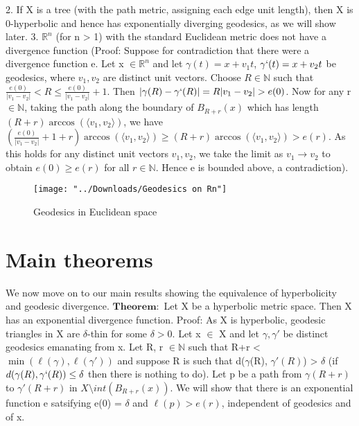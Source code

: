 \documentclass[11pt]{article}
\newcommand{\vs}{\vskip10pt}
\begin{document}
	
	\vs
	2. If X is a tree (with the path metric, assigning each edge unit length), then X is 0-hyperbolic and hence has exponentially diverging geodesics, as we will show later.
	\vs
	3. $\mathbb{R}^n$ (for n > 1) with the standard Euclidean metric does not have a divergence function (Proof: Suppose for contradiction that there were a divergence function e. Let x $\in \mathbb{R}^n$ and let $\gamma(t) = x + v_1t$, $\gamma`(t) = x + v_2t$ be geodesics, where $v_1, v_2 $ are distinct unit vectors. Choose $R \in \mathbb{N}$ such that $\frac{e(0)}{\vert v_1 - v_2 \vert } < R \leq \frac{e(0)}{\vert v_1 - v_2 \vert } + 1$. Then $\vert \gamma(R) - \gamma`(R) \vert = R \vert v_1 - v_2 \vert > e(0)$. Now for any r $\in \mathbb{N}$, taking the path along the boundary of $B_{R+r}(x)$ which has length $(R+r) \arccos(\langle v_1, v_2 \rangle)$, we have $(\frac{e(0)}{\vert v_1 - v_2 \vert} + 1 + r)\arccos(\langle v_1, v_2 \rangle) \geq (R+r)\arccos(\langle v_1, v_2 \rangle) > e(r)$. As this holds for any distinct unit vectors $v_1, v_2$, we take the limit as $v_1 \rightarrow v_2$ to obtain $e(0) \geq e(r)$ for all $r \in \mathbb{N}$. Hence e is bounded above, a contradiction). 
	
		\begin{figure}[h]
		\centering
		\texttt{[image: "../Downloads/Geodesics on Rn"]}
		\caption{Geodesics in Euclidean space}
		\label{Figure 3: Geodesics in Euclidean space}
		
	\end{figure}
	
	\vskip80pt
	\section{Main theorems}
	
	We now move on to our main results showing the equivalence of hyperbolicity and geodesic divergence. 
	\vs
	$\mathbf{Theorem: }$ Let X be a hyperbolic metric space. Then X has an exponential divergence function. 
	\vs 
	Proof: As X is hyperbolic, geodesic triangles in X are $\delta $-thin for some $\delta > 0$. Let x $\in $ X and let $\gamma, \gamma'$ be distinct geodesics emanating from x. Let R, r $\in \mathbb{N}$ such that R+r < $\min(\ell(\gamma), \ell(\gamma'))$ and suppose R is such that d($\gamma$(R), $\gamma'(R)$) > $\delta$ (if $d(\gamma(R), \gamma`(R)) \leq \delta$ then there is nothing to do). Let p be a path from $\gamma(R+r)$ to $\gamma'(R+r)$ in $X \setminus int(B_{R+r}(x))$. We will show that there is an exponential function e satsifying e(0) = $\delta$ and $\ell(p) > e(r)$, independent of geodesics and of x. 
	
\end{document}
